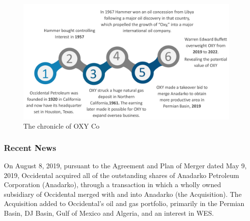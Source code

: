\documentclass[
	a4paper, %
	12pt,%
]{CSSullivanBusinessReport}
\begin{document}
\begin{fullwidth}
\begin{figure}[h]
    \centering
    \includegraphics[width=18cm]{Images/chronicle.pdf}
    \caption{The chronicle of OXY Co}
    \label{chronicle}
\end{figure}
\par


\subsubsection{Recent News}

On August 8, 2019, pursuant to the Agreement and Plan of Merger dated May 9, 2019, Occidental acquired all of the
outstanding shares of Anadarko Petroleum Corporation (Anadarko), through a transaction in which a wholly owned
subsidiary of Occidental merged with and into Anadarko (the Acquisition). The Acquisition added to Occidental's oil and gas
portfolio, primarily in the Permian Basin, DJ Basin, Gulf of Mexico and Algeria, and an interest in WES.


\end{fullwidth}
\end{document}
